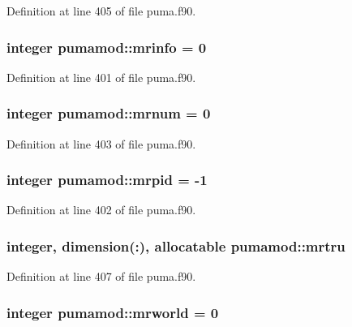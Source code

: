 \-Definition at line 405 of file puma.\-f90.

\hypertarget{classpumamod_a52d0e34b3a5be19fc3b8d0f11cae3cd2}{
\subsubsection[{mrinfo}]{\setlength{\rightskip}{0pt plus 5cm}integer {\bf pumamod\-::mrinfo} = 0}}
\label{classpumamod_a52d0e34b3a5be19fc3b8d0f11cae3cd2}


\-Definition at line 401 of file puma.\-f90.

\hypertarget{classpumamod_aca86db6e1c10c1b9517477ce5edbe883}{
\subsubsection[{mrnum}]{\setlength{\rightskip}{0pt plus 5cm}integer {\bf pumamod\-::mrnum} = 0}}
\label{classpumamod_aca86db6e1c10c1b9517477ce5edbe883}


\-Definition at line 403 of file puma.\-f90.

\hypertarget{classpumamod_a7243d78ff49021834f74c4f372747e25}{
\subsubsection[{mrpid}]{\setlength{\rightskip}{0pt plus 5cm}integer {\bf pumamod\-::mrpid} = -\/1}}
\label{classpumamod_a7243d78ff49021834f74c4f372747e25}


\-Definition at line 402 of file puma.\-f90.

\hypertarget{classpumamod_a6f3661b2cfef35aad460858a54bac179}{
\subsubsection[{mrtru}]{\setlength{\rightskip}{0pt plus 5cm}integer, dimension(\-:), allocatable {\bf pumamod\-::mrtru}}}
\label{classpumamod_a6f3661b2cfef35aad460858a54bac179}


\-Definition at line 407 of file puma.\-f90.

\hypertarget{classpumamod_afdffea792867b992f5d1d117bea912e9}{
\subsubsection[{mrworld}]{\setlength{\rightskip}{0pt plus 5cm}integer {\bf pumamod\-::mrworld} = 0}}
\label{classpumamod_afdffea792867b992f5d1d117bea912e9}


